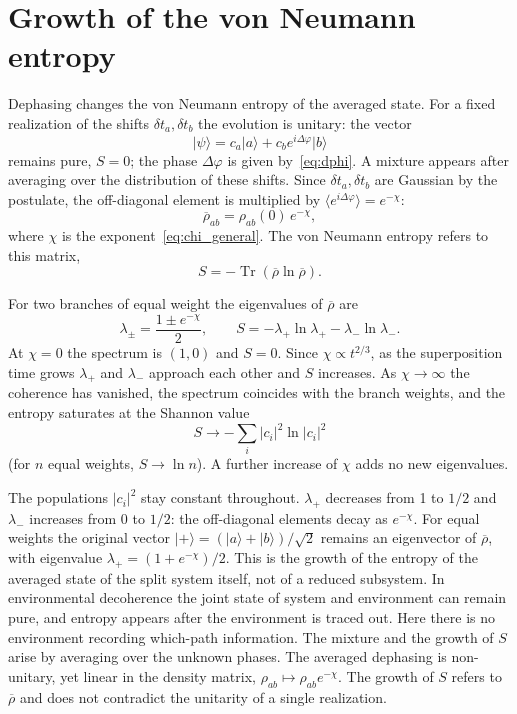 \documentclass[11pt,a4paper]{article}
\begin{document}
\section{Growth of the von Neumann entropy}\label{sec:entropy}

Dephasing changes the von Neumann entropy of the averaged state. For a fixed realization of the shifts $\delta t_a,\delta t_b$ the evolution is unitary: the vector
\begin{equation}
|\psi\rangle=c_a|a\rangle+c_b e^{i\Delta\varphi}|b\rangle
\label{eq:psi_phase}
\end{equation}
remains pure, $S=0$; the phase $\Delta\varphi$ is given by~\eqref{eq:dphi}. A mixture appears after averaging over the distribution of these shifts. Since $\delta t_a,\delta t_b$ are Gaussian by the postulate, the off-diagonal element is multiplied by $\langle e^{i\Delta\varphi}\rangle=e^{-\chi}$:
\begin{equation}
\overline{\rho}_{ab}=\rho_{ab}(0)\,e^{-\chi},
\label{eq:rho_avg}
\end{equation}
where $\chi$ is the exponent~\eqref{eq:chi_general}. The von Neumann entropy refers to this matrix,
\begin{equation}
S=-\operatorname{Tr}(\overline{\rho}\ln\overline{\rho}).
\label{eq:SvN}
\end{equation}

For two branches of equal weight the eigenvalues of $\overline{\rho}$ are
\begin{equation}
\lambda_\pm=\frac{1\pm e^{-\chi}}{2},
\qquad
S=-\lambda_+\ln\lambda_+-\lambda_-\ln\lambda_-.
\label{eq:Stwo}
\end{equation}
At $\chi=0$ the spectrum is $(1,0)$ and $S=0$. Since $\chi\propto t^{2/3}$, as the superposition time grows $\lambda_+$ and $\lambda_-$ approach each other and $S$ increases. As $\chi\to\infty$ the coherence has vanished, the spectrum coincides with the branch weights, and the entropy saturates at the Shannon value
\begin{equation}
S\to-\sum_i|c_i|^2\ln|c_i|^2
\label{eq:Ssat}
\end{equation}
(for $n$ equal weights, $S\to\ln n$). A further increase of $\chi$ adds no new eigenvalues.

The populations $|c_i|^2$ stay constant throughout. $\lambda_+$ decreases from 1 to $1/2$ and $\lambda_-$ increases from 0 to $1/2$: the off-diagonal elements decay as $e^{-\chi}$. For equal weights the original vector $|+\rangle=(|a\rangle+|b\rangle)/\sqrt{2}$ remains an eigenvector of $\overline{\rho}$, with eigenvalue $\lambda_+=(1+e^{-\chi})/2$. This is the growth of the entropy of the averaged state of the split system itself, not of a reduced subsystem. In environmental decoherence the joint state of system and environment can remain pure, and entropy appears after the environment is traced out. Here there is no environment recording which-path information. The mixture and the growth of $S$ arise by averaging over the unknown phases. The averaged dephasing is non-unitary, yet linear in the density matrix, $\rho_{ab}\mapsto\rho_{ab}e^{-\chi}$. The growth of $S$ refers to $\overline{\rho}$ and does not contradict the unitarity of a single realization.
\end{document}
